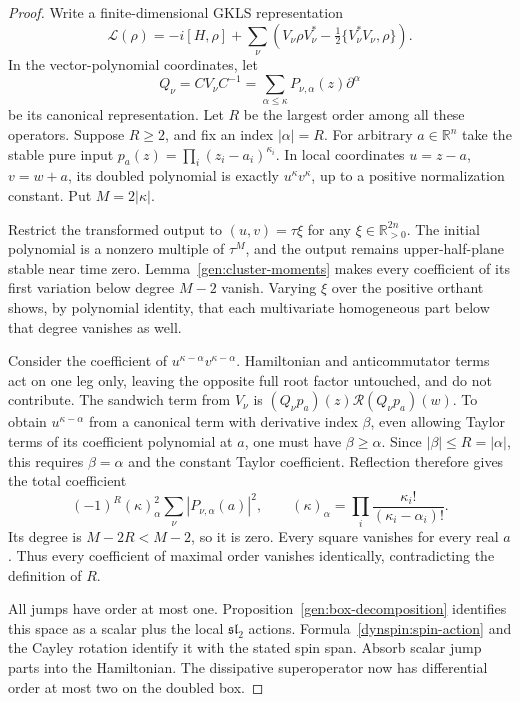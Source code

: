 \documentclass[reqno]{amsart}
\theoremstyle{definition}
\theoremstyle{remark}
\newcommand{\R}{\mathbb R}
\begin{document}
\begin{proof}
Write a finite-dimensional GKLS representation
\[
 \mathcal L(\rho)=-i[H,\rho]
 +\sum_\nu\left(V_\nu\rho V_\nu^*
                  -\tfrac12\{V_\nu^*V_\nu,\rho\}\right).
\]
In the vector-polynomial coordinates, let
\[
 Q_\nu=CV_\nu C^{-1}
       =\sum_{\alpha\leq\kappa}P_{\nu,\alpha}(z)\partial^\alpha
\]
be its canonical representation.  Let $R$ be the largest order among
all these operators.  Suppose $R\geq2$, and fix an index
$|\alpha|=R$.  For arbitrary $a\in\R^n$ take the stable pure input
$p_a(z)=\prod_i(z_i-a_i)^{\kappa_i}$.  In local coordinates
$u=z-a$, $v=w+a$, its doubled polynomial is exactly $u^\kappa v^\kappa$,
up to a positive normalization constant.  Put $M=2|\kappa|$.

Restrict the transformed output to $(u,v)=\tau\xi$ for any
$\xi\in\R_{>0}^{2n}$.  The initial polynomial is a nonzero multiple
of $\tau^M$, and the output remains upper-half-plane stable near time
zero.  Lemma~\ref{gen:cluster-moments} makes every coefficient of its
first variation below degree $M-2$ vanish.  Varying $\xi$ over the
positive orthant shows, by polynomial identity, that each multivariate
homogeneous part below that degree vanishes as well.

Consider the coefficient of $u^{\kappa-\alpha}v^{\kappa-\alpha}$.
Hamiltonian and anticommutator terms act on one leg only, leaving the
opposite full root factor untouched, and do not contribute.  The
sandwich term from $V_\nu$ is
$(Q_\nu p_a)(z)\mathscr R(Q_\nu p_a)(w)$.  To obtain
$u^{\kappa-\alpha}$ from a canonical term with derivative index $\beta$,
even allowing Taylor terms of its coefficient polynomial at $a$, one
must have $\beta\geq\alpha$.  Since $|\beta|\leq R=|\alpha|$, this
requires $\beta=\alpha$ and the constant Taylor coefficient.  Reflection
therefore gives the total coefficient
\begin{equation}\label{dynspin:squares}
 (-1)^R(\kappa)_\alpha^2
       \sum_\nu|P_{\nu,\alpha}(a)|^2,
 \qquad
 (\kappa)_\alpha=\prod_i\frac{\kappa_i!}{(\kappa_i-\alpha_i)!}.
\end{equation}
Its degree is $M-2R<M-2$, so it is zero.  Every square vanishes for
every real $a$.  Thus every coefficient of maximal order vanishes
identically, contradicting the definition of $R$.

All jumps have order at most one.  Proposition~\ref{gen:box-decomposition}
identifies this space as a scalar plus the local $\mathfrak{sl}_2$
actions.  Formula~\eqref{dynspin:spin-action} and the Cayley rotation
identify it with the stated spin span.  Absorb scalar jump parts into
the Hamiltonian.  The dissipative superoperator now has differential
order at most two on the doubled box.


\end{proof}
\end{document}
